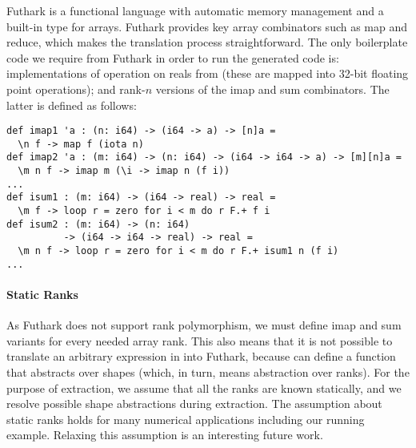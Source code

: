 Futhark is a functional language with automatic memory management and
a built-in type for arrays.  Futhark provides key array combinators such as
map and reduce, which makes the translation process straightforward.
The only boilerplate code we require from Futhark in order
to run the generated code is: implementations of operation on reals
from  (these are mapped into 32-bit floating point operations);
and rank-$n$ versions of the imap and sum combinators.  The latter is defined
as follows:
\begin{Verbatim}
def imap1 'a : (n: i64) -> (i64 -> a) -> [n]a =
  \n f -> map f (iota n)
def imap2 'a : (m: i64) -> (n: i64) -> (i64 -> i64 -> a) -> [m][n]a =
  \m n f -> imap m (\i -> imap n (f i))
...
def isum1 : (m: i64) -> (i64 -> real) -> real =
  \m f -> loop r = zero for i < m do r F.+ f i
def isum2 : (m: i64) -> (n: i64)
          -> (i64 -> i64 -> real) -> real =
  \m n f -> loop r = zero for i < m do r F.+ isum1 n (f i)
...
\end{Verbatim}


\paragraph{Static Ranks} As Futhark does not support rank polymorphism,
we must define imap and sum variants for every needed array rank. This also means that
it is not possible to translate an arbitrary expression in  into
Futhark, because  can define a function that abstracts over shapes
(which, in turn, means abstraction over ranks).  For the purpose of
extraction, we assume that all the ranks are known statically, and we
resolve possible shape abstractions during extraction.  The assumption about
static ranks holds for many numerical applications including our
running example.  Relaxing this assumption is an interesting future work.

